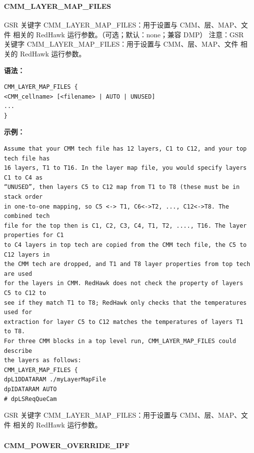 \subsubsection{}
\paragraph*{CMM_LAYER_MAP_FILES}

GSR 关键字 CMM_LAYER_MAP_FILES：用于设置与 CMM、层、MAP、文件 相关的 RedHawk 运行参数。（可选；默认：none；兼容 DMP） 注意：GSR 关键字 CMM_LAYER_MAP_FILES：用于设置与 CMM、层、MAP、文件 相关的 RedHawk 运行参数。

\textbf{语法：}
\begin{lstlisting}
CMM_LAYER_MAP_FILES {
<CMM_cellname> [<filename> | AUTO | UNUSED]
...
}
\end{lstlisting}

\textbf{示例：}
\begin{lstlisting}
Assume that your CMM tech file has 12 layers, C1 to C12, and your top tech file has
16 layers, T1 to T16. In the layer map file, you would specify layers C1 to C4 as
“UNUSED”, then layers C5 to C12 map from T1 to T8 (these must be in stack order
in one-to-one mapping, so C5 <-> T1, C6<->T2, ..., C12<->T8. The combined tech
file for the top then is C1, C2, C3, C4, T1, T2, ...., T16. The layer properties for C1
to C4 layers in top tech are copied from the CMM tech file, the C5 to C12 layers in
the CMM tech are dropped, and T1 and T8 layer properties from top tech are used
for the layers in CMM. RedHawk does not check the property of layers C5 to C12 to
see if they match T1 to T8; RedHawk only checks that the temperatures used for
extraction for layer C5 to C12 matches the temperatures of layers T1 to T8.
For three CMM blocks in a top level run, CMM_LAYER_MAP_FILES could describe
the layers as follows:
CMM_LAYER_MAP_FILES {
dpL1DDATARAM ./myLayerMapFile
dpIDATARAM AUTO
# dpLSReqQueCam
\end{lstlisting}

\begin{noteBox}
GSR 关键字 CMM\_LAYER\_MAP\_FILES：用于设置与 CMM、层、MAP、文件 相关的 RedHawk 运行参数。
\end{noteBox}

\subsubsection{}
\paragraph*{CMM_POWER_OVERRIDE_IPF}

